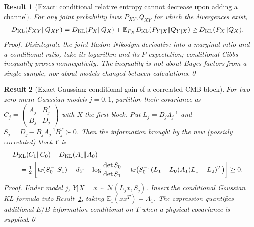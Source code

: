 \documentclass[aps,prd,onecolumn,notitlepage,groupedaddress,11pt]{revtex4-2}
\newtheorem{result}{Result}
\begin{document}
\begin{result}[\textsf{Exact}: conditional relative entropy cannot decrease upon adding a channel]\label{new:233}
For any joint probability laws $P_{XY},Q_{XY}$ for which the divergences exist,
\begin{equation}\label{eq:244-233}
D_{\rm KL}(P_{XY}\Vert Q_{XY})=D_{\rm KL}(P_X\Vert Q_X)+\mathbb E_{P_X}D_{\rm KL}(P_{Y|X}\Vert Q_{Y|X})\ge D_{\rm KL}(P_X\Vert Q_X).
\end{equation}
\textit{Proof.} Disintegrate the joint Radon--Nikodym derivative into a marginal ratio and a conditional ratio, take its logarithm and its $P$-expectation; conditional Gibbs inequality proves nonnegativity. The inequality is not about Bayes factors from a single sample, nor about models changed between calculations.\qed
\end{result}

\begin{result}[\textsf{Exact Gaussian}: conditional gain of a correlated CMB block]\label{new:234}
For two zero-mean Gaussian models $j=0,1$, partition their covariance as $C_j=\left(\begin{smallmatrix}A_j&B_j^T\\B_j&D_j\end{smallmatrix}\right)$ with $X$ the first block. Put $L_j=B_jA_j^{-1}$ and $S_j=D_j-B_jA_j^{-1}B_j^T\succ0$. Then the information brought by the new (possibly correlated) block $Y$ is
\begin{align}\label{eq:244-234}
& D_{\rm KL}(C_1\Vert C_0)-D_{\rm KL}(A_1\Vert A_0)\\
&\quad=\tfrac12\left[\operatorname{tr}(S_0^{-1}S_1)-d_Y+\log\frac{\det S_0}{\det S_1}+\operatorname{tr}\!\left(S_0^{-1}(L_1-L_0)A_1(L_1-L_0)^T\right)\right]\ge0.\nonumber
\end{align}
\textit{Proof.} Under model $j$, $Y|X=x\sim\mathcal N(L_jx,S_j)$. Insert the conditional Gaussian KL formula into Result~\ref{new:233}, taking $\mathbb E_1(xx^T)=A_1$. The expression quantifies additional $E/B$ information conditional on $T$ \emph{when a physical covariance is supplied}.\qed
\end{result}
\end{document}
